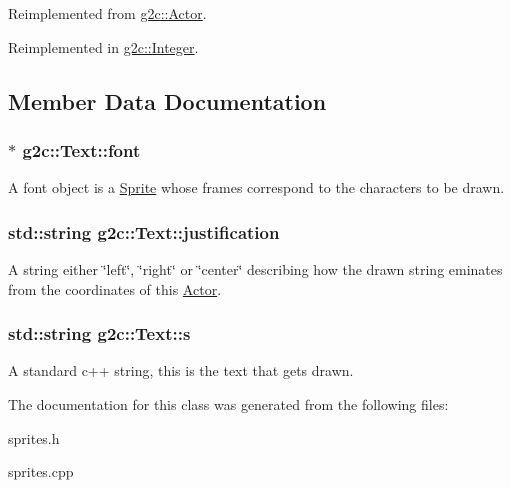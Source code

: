 Reimplemented from \hyperlink{classg2c_1_1_actor_a587aff8d8df73dbba0c659459e094074}{g2c::Actor}.

Reimplemented in \hyperlink{classg2c_1_1_integer_aac99d7502a55bf5db01f5d673779e36e}{g2c::Integer}.

\subsection{Member Data Documentation}
\hypertarget{classg2c_1_1_text_a1bb9fa51e3d58a6561d4449495d3ce75}{
\subsubsection[{font}]{$\ast$ {\bf g2c::Text::font}}}
\label{classg2c_1_1_text_a1bb9fa51e3d58a6561d4449495d3ce75}
A font object is a \hyperlink{classg2c_1_1_sprite}{Sprite} whose frames correspond to the characters to be drawn. \hypertarget{classg2c_1_1_text_a0b1d9a8876fced2290eeda161d992084}{
\subsubsection[{justification}]{\setlength{\rightskip}{0pt plus 5cm}std::string {\bf g2c::Text::justification}}}
\label{classg2c_1_1_text_a0b1d9a8876fced2290eeda161d992084}
A string either \char`\"{}left\char`\"{}, \char`\"{}right\char`\"{} or \char`\"{}center\char`\"{} describing how the drawn string eminates from the coordinates of this \hyperlink{classg2c_1_1_actor}{Actor}. \hypertarget{classg2c_1_1_text_a9b4447b44f0831b3f40ef12ebac60dc1}{
\subsubsection[{s}]{\setlength{\rightskip}{0pt plus 5cm}std::string {\bf g2c::Text::s}}}
\label{classg2c_1_1_text_a9b4447b44f0831b3f40ef12ebac60dc1}
A standard c++ string, this is the text that gets drawn. 

The documentation for this class was generated from the following files:\begin{DoxyCompactItemize}
\item 
sprites.h\item 
sprites.cpp\end{DoxyCompactItemize}
